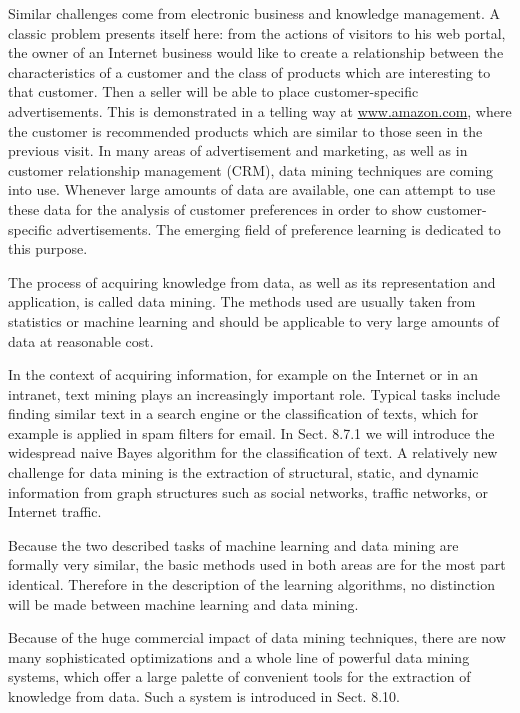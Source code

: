 \documentclass[10pt]{article}
\begin{document}
Similar challenges come from electronic business and knowledge management. A classic problem presents itself here: from the actions of visitors to his web portal, the owner of an Internet business would like to create a relationship between the characteristics of a customer and the class of products which are interesting to that customer. Then a seller will be able to place customer-specific advertisements. This is demonstrated in a telling way at \href{http://www.amazon.com}{www.amazon.com}, where the customer is recommended products which are similar to those seen in the previous visit. In many areas of advertisement and marketing, as well as in customer relationship management (CRM), data mining techniques are coming into use. Whenever large amounts of data are available, one can attempt to use these data for the analysis of customer preferences in order to show customer-specific advertisements. The emerging field of preference learning is dedicated to this purpose.

The process of acquiring knowledge from data, as well as its representation and application, is called data mining. The methods used are usually taken from statistics or machine learning and should be applicable to very large amounts of data at reasonable cost.

In the context of acquiring information, for example on the Internet or in an intranet, text mining plays an increasingly important role. Typical tasks include finding similar text in a search engine or the classification of texts, which for example is applied in spam filters for email. In Sect. 8.7.1 we will introduce the widespread naive Bayes algorithm for the classification of text. A relatively new challenge for data mining is the extraction of structural, static, and dynamic information from graph structures such as social networks, traffic networks, or Internet traffic.

Because the two described tasks of machine learning and data mining are formally very similar, the basic methods used in both areas are for the most part identical. Therefore in the description of the learning algorithms, no distinction will be made between machine learning and data mining.

Because of the huge commercial impact of data mining techniques, there are now many sophisticated optimizations and a whole line of powerful data mining systems, which offer a large palette of convenient tools for the extraction of knowledge from data. Such a system is introduced in Sect. 8.10.
\end{document}
